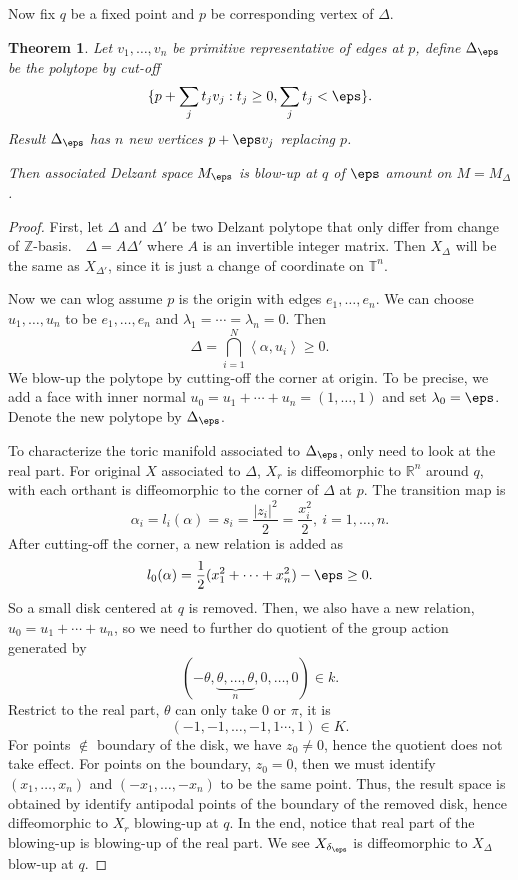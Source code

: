 \documentclass[12pt]{article}
\theoremstyle{plain}\newtheorem{theorem}{Theorem}
\theoremstyle{definition}\newtheorem{definition}[theorem]{Definition}
\theoremstyle{definition}\newtheorem{example}[theorem]{Example}
\theoremstyle{plain}\newtheorem{axiom}[theorem]{Axiom}
\theoremstyle{plain}\newtheorem{assertion}[theorem]{Assertion}
\theoremstyle{plain}\newtheorem{corollary}[theorem]{Corollary}
\theoremstyle{plain}\newtheorem{lemma}[theorem]{Lemma}
\theoremstyle{plain}\newtheorem{proposition}[theorem]{Proposition}
\theoremstyle{plain}\newtheorem{prop}[theorem]{Proposition}
\theoremstyle{plain}\newtheorem{conjecture}[theorem]{Conjecture}
\theoremstyle{plain}\newtheorem{conj}[theorem]{Conjecture}
\theoremstyle{plain}\newtheorem{problem}[theorem]{Problem}
\theoremstyle{remark}\newtheorem{notation}[theorem]{Notation}
\theoremstyle{definition}\newtheorem*{question}{Question}
\theoremstyle{definition}\newtheorem*{answer}{Answer}
\theoremstyle{definition}\newtheorem*{goal}{Goal}
\theoremstyle{plain}\newtheorem*{application}{Application}
\theoremstyle{plain}\newtheorem*{exercise}{Exercise}
\theoremstyle{remark}\newtheorem*{remark}{Remark}
\theoremstyle{remark}\newtheorem*{note}{\small{Note}}
\numberwithin{equation}{section}
\numberwithin{theorem}{section}
\numberwithin{figure}{section}
\begin{document}
Now fix \(q\) be a fixed point and \(p\) be corresponding vertex of \(\Delta\).
\begin{theorem}
    Let \(v_1,\ldots,v_n\) be primitive representative of edges at \(p\), define
    \(\Delta_\eps\) be the polytope by cut-off \[
        \{p+\sum_j t_j v_j:t_j\ge 0,\sum_j t_j <\eps\}
    .\] Result \(\Delta_\eps\) has \(n\) new vertices \({p+\eps v_j}\)
    replacing \(p\).

    Then associated Delzant space \(M_\eps\) is blow-up at \(q\) of \(\eps\) amount
    on \(M=M_\Delta\).
\end{theorem}
\begin{proof}
First, let \(\Delta\) and \(\Delta'\) be two Delzant polytope that only differ from
change of \(\mathbb{Z}\)-basis.\ \ie\ \(\Delta=A\Delta'\) where \(A\) is an invertible
integer matrix. Then \(X_\Delta\) will be the same as \(X_{\Delta'}\), since it is
just a change of coordinate on \(\mathbb{T}^n\).

Now we can wlog assume \(p\) is the origin with edges \(e_1,\ldots,e_n\). We can
choose \(u_1,\ldots,u_n\) to be \(e_1,\ldots,e_n\) and
\(\lambda_1=\cdots =\lambda_n=0\). Then \[
    \Delta=\bigcap_{i=1}^N \left<\alpha,u_i\right> \ge 0
.\] We blow-up the polytope by cutting-off the corner at origin. To be precise, we
add a face with inner normal \(u_0=u_1+\cdots +u_n=(1,\ldots,1)\) and set
\(\lambda_0=\eps\). Denote the new polytope by \(\Delta_\eps\).

To characterize the toric manifold associated to \(\Delta_\eps\), only need to look
at the real part. For original \(X\) associated to \(\Delta\), \(X_r\) is
diffeomorphic to \(\mathbb{R}^n\) around \(q\), with each orthant is diffeomorphic 
to the corner of \(\Delta\) at \(p\). The transition map is \[
    \alpha_i=l_i(\alpha)=s_i=\frac{|z_i|^2}{2}=\frac{x_i^2}{2},\ i=1,\ldots,n
.\] After cutting-off the corner, a new relation is added as \[
    l_0(\alpha)=\frac{1}{2}(x_1^2+\cdots +x_n^2)-\eps\ge 0
.\] So a small disk centered at \(q\) is removed. Then, we also have a new relation,
\ie\ \(u_0=u_1+\cdots +u_n\), so we need to further do quotient of the group action
generated by \[
    (-\theta,\underbrace{\theta,\ldots,\theta}_{n},0,\ldots,0)\in k
.\] Restrict to the real part, \(\theta\) can only take \(0\) or \(\pi\), it is \[
    (-1,-1,\ldots,-1,1\cdots,1)\in K
.\] For points \(\not\in \) boundary of the disk, we have \(z_0\neq 0\), hence the
quotient does not take effect. For points on the boundary, \(z_0=0\), then we must
identify \((x_1,\ldots,x_n)\) and \((-x_1,\ldots,-x_n)\) to be the same point.
Thus, the result space is obtained by identify antipodal points of the boundary
of the removed disk, hence diffeomorphic to \(X_r\) blowing-up at \(q\). In the end,
notice that real part of the blowing-up is blowing-up of the real part. We see
\(X_{\delta_\eps}\) is diffeomorphic to \(X_\Delta\) blow-up at \(q\).


\end{proof}
\end{document}
